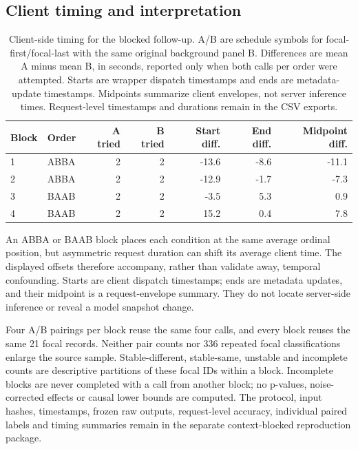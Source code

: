 \documentclass[11pt,a4paper]{article}
\begin{document}
\subsection{Client timing and interpretation}
\begin{table}[htbp]\centering\small
\caption{Client-side timing for the blocked follow-up. A/B are schedule symbols for focal-first/focal-last with the same original background panel B. Differences are mean A minus mean B, in seconds, reported only when both calls per order were attempted. Starts are wrapper dispatch timestamps and ends are metadata-update timestamps. Midpoints summarize client envelopes, not server inference times. Request-level timestamps and durations remain in the CSV exports.}
\label{tab:context_blocked_timing}
\begin{tabular}{@{}llrrrrr@{}}\toprule
Block & Order & A tried & B tried & Start diff. & End diff. & Midpoint diff. \\\midrule
1 & ABBA & 2 & 2 & -13.6 & -8.6 & -11.1 \\
2 & ABBA & 2 & 2 & -12.9 & -1.7 & -7.3 \\
3 & BAAB & 2 & 2 & -3.5 & 5.3 & 0.9 \\
4 & BAAB & 2 & 2 & 15.2 & 0.4 & 7.8 \\
\bottomrule\end{tabular}\end{table}

An ABBA or BAAB block places each condition at the same average ordinal position, but asymmetric request duration can shift its average client time. The displayed offsets therefore accompany, rather than validate away, temporal confounding. Starts are client dispatch timestamps; ends are metadata updates, and their midpoint is a request-envelope summary. They do not locate server-side inference or reveal a model snapshot change.

Four A/B pairings per block reuse the same four calls, and every block reuses the same 21 focal records. Neither pair counts nor 336 repeated focal classifications enlarge the source sample. Stable-different, stable-same, unstable and incomplete counts are descriptive partitions of these focal IDs within a block. Incomplete blocks are never completed with a call from another block; no p-values, noise-corrected effects or causal lower bounds are computed. The protocol, input hashes, timestamps, frozen raw outputs, request-level accuracy, individual paired labels and timing summaries remain in the separate context-blocked reproduction package.
\end{document}
